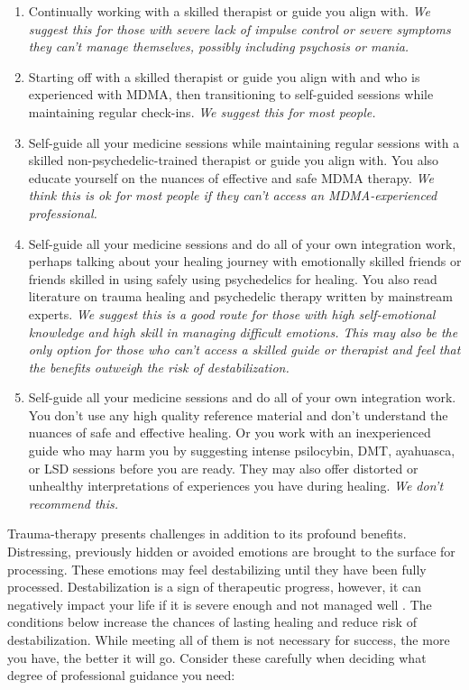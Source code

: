 \documentclass[12pt,letterpaper]{article}
\begin{document}
\begin{enumerate}
    \item Continually working with a skilled therapist or guide you align with. \textit{We suggest this for those with severe lack of impulse control or severe symptoms they can't manage themselves, possibly including psychosis or mania.} 
    \item Starting off with a skilled therapist or guide you align with and who is experienced with MDMA, then transitioning to self-guided sessions while maintaining regular check-ins. \textit{We suggest this for most people.}
    \item Self-guide all your medicine sessions while maintaining regular sessions with a skilled non-psychedelic-trained therapist or guide you align with. You also educate yourself on the nuances of effective and safe MDMA therapy. \textit{We think this is ok for most people if they can't access an MDMA-experienced professional.}
    \item Self-guide all your medicine sessions and do all of your own integration work, perhaps talking about your healing journey with emotionally skilled friends or friends skilled in using safely using psychedelics for healing. You also read literature on trauma healing and psychedelic therapy written by mainstream experts. \textit{We suggest this is a good route for those with high self-emotional knowledge and high skill in managing difficult emotions. This may also be the only option for those who can't access a skilled guide or therapist and feel that the benefits outweigh the risk of destabilization.} 
    \item Self-guide all your medicine sessions and do all of your own integration work. You don't use any high quality reference material and don't understand the nuances of safe and effective healing. Or you work with an inexperienced guide who may harm you by suggesting intense psilocybin, DMT, ayahuasca, or LSD sessions before you are ready. They may also offer distorted or unhealthy interpretations of experiences you have during healing. \textit{We don't recommend this.} 
\end{enumerate}
Trauma-therapy presents challenges in addition to its profound benefits. Distressing, previously hidden or avoided emotions are brought to the surface for processing. These emotions may feel destabilizing until they have been fully processed. Destabilization is a sign of therapeutic progress, however, it can negatively impact your life if it is severe enough and not managed well \cite{olthofDestabilization}. The conditions below increase the chances of lasting healing and reduce risk of destabilization. While meeting all of them is not necessary for success, the more you have, the better it will go. Consider these carefully when deciding what degree of professional guidance you need:  
\end{document}

